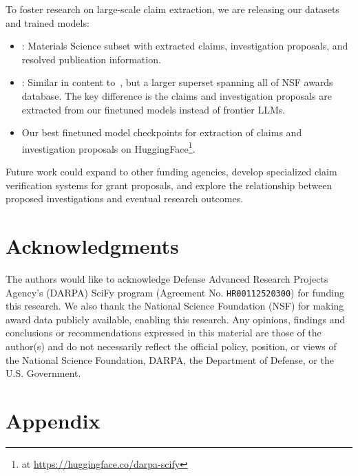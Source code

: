 \documentclass[11pt]{article}
\begin{document}
To foster research on large-scale claim extraction, we are releasing our datasets and trained models:
\begin{itemize}[noitemsep,topsep=0pt]
\item \DatasetNameMatSci: Materials Science subset with extracted claims, investigation proposals, and resolved publication information.
\item \DatasetName: Similar in content to~\DatasetNameMatSci, but a larger superset spanning all of NSF awards database. The key difference is the claims and investigation proposals are extracted from our finetuned models instead of frontier LLMs.
\item Our best finetuned model checkpoints for extraction of claims and investigation proposals on HuggingFace\footnote{at \url{https://huggingface.co/darpa-scify}}.
\end{itemize}

Future work could expand to other funding agencies, develop specialized claim verification systems for grant proposals, and explore the relationship between proposed investigations and eventual research outcomes.

\section*{Acknowledgments}
The authors would like to acknowledge Defense Advanced Research Projects Agency’s (DARPA) SciFy program (Agreement No. \texttt{HR00112520300}) for funding this research. We also thank the National Science Foundation (NSF) for making award data publicly available, enabling this research. Any opinions, findings and conclusions or recommendations expressed in this material are those of the author(s) and do not necessarily reflect the official policy, position, or views of the National Science Foundation, DARPA, the Department of Defense, or the U.S. Government.

%


\clearpage

\section*{Appendix}

\appendix
\end{document}
